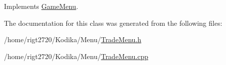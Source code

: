 Implements \hyperlink{classGameMenu_ac32ff465c5a4f30979e8851fa21cb230}{Game\-Menu}.



The documentation for this class was generated from the following files\-:\begin{DoxyCompactItemize}
\item 
/home/rigt2720/\-Kodika/\-Menu/\hyperlink{TradeMenu_8h}{Trade\-Menu.\-h}\item 
/home/rigt2720/\-Kodika/\-Menu/\hyperlink{TradeMenu_8cpp}{Trade\-Menu.\-cpp}\end{DoxyCompactItemize}
